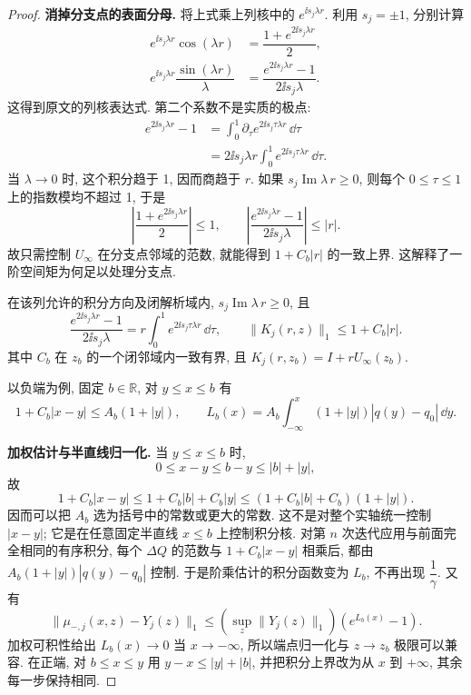 \begin{proof}
\par\medskip\noindent\textbf{消掉分支点的表面分母.}\quad 
将上式乘上列核中的 $e^{\ii s_j\lambda r}$.
利用 $s_j=\pm1$, 分别计算
\begin{align*}
e^{\ii s_j\lambda r}\cos(\lambda r)
&=\dfrac{1+e^{2\ii s_j\lambda r}}{2},\\
e^{\ii s_j\lambda r}\dfrac{\sin(\lambda r)}{\lambda}
&=\dfrac{e^{2\ii s_j\lambda r}-1}{2\ii s_j\lambda}.
\end{align*}
这得到原文的列核表达式. 第二个系数不是实质的极点:
\begin{align*}
e^{2\ii s_j\lambda r}-1
&=\int_0^1\partial_\tau
 e^{2\ii s_j\tau\lambda r}\,\dd\tau\\
&=2\ii s_j\lambda r\int_0^1
 e^{2\ii s_j\tau\lambda r}\,\dd\tau.
\end{align*}
当 $\lambda\to0$ 时, 这个积分趋于 1, 因而商趋于 $r$.
如果 $s_j\operatorname{Im}\lambda\,r\ge0$, 则每个
$0\le\tau\le1$ 上的指数模均不超过 1, 于是
\[
\left|\dfrac{1+e^{2\ii s_j\lambda r}}{2}\right|\le1,
\qquad
\left|\dfrac{e^{2\ii s_j\lambda r}-1}{2\ii s_j\lambda}\right|
\le|r|.
\]
故只需控制 $U_\infty$ 在分支点邻域的范数,
就能得到 $1+C_b|r|$ 的一致上界.
这解释了一阶空间矩为何足以处理分支点.

在该列允许的积分方向及闭解析域内, $s_j\operatorname{Im}\lambda\,r\ge0$, 且
\[
\dfrac{e^{2\ii s_j\lambda r}-1}{2\ii s_j\lambda}
=r\int_0^1 e^{2\ii s_j\tau\lambda r}\,\dd\tau,\qquad
\|K_j(r,z)\|_1\le1+C_b|r|.
\]
其中 $C_b$ 在 $z_b$ 的一个闭邻域内一致有界, 且 $K_j(r,z_b)=I+rU_\infty(z_b)$.

以负端为例, 固定 $b\in\mathbb R$, 对 $y\le x\le b$ 有
\[
1+C_b|x-y|\le A_b(1+|y|),\qquad
L_b(x)=A_b\int_{-\infty}^{x}(1+|y|)|q(y)-q_0|\,\dd y.
\]

\par\medskip\noindent\textbf{加权估计与半直线归一化.}\quad 
当 $y\le x\le b$ 时,
\[
0\le x-y\le b-y\le|b|+|y|,
\]
故
\[
1+C_b|x-y|
\le 1+C_b|b|+C_b|y|
\le (1+C_b|b|+C_b)(1+|y|).
\]
因而可以把 $A_b$ 选为括号中的常数或更大的常数.
这不是对整个实轴统一控制 $|x-y|$;
它是在任意固定半直线 $x\le b$ 上控制积分核.
对第 $n$ 次迭代应用与前面完全相同的有序积分,
每个 $\Delta Q$ 的范数与 $1+C_b|x-y|$ 相乘后,
都由 $A_b(1+|y|)|q(y)-q_0|$ 控制.
于是阶乘估计的积分函数变为 $L_b$, 不再出现 $\dfrac{1}{\gamma}$.
又有
\[
\|\mu_{-,j}(x,z)-Y_j(z)\|_1
\le\left(\sup\limits_z\|Y_j(z)\|_1\right)(e^{L_b(x)}-1).
\]
加权可积性给出 $L_b(x)\to0$ 当 $x\to-\infty$,
所以端点归一化与 $z\to z_b$ 极限可以兼容.
在正端, 对 $b\le x\le y$ 用
$y-x\le |y|+|b|$, 并把积分上界改为从 $x$ 到 $+\infty$,
其余每一步保持相同.


\end{proof}
